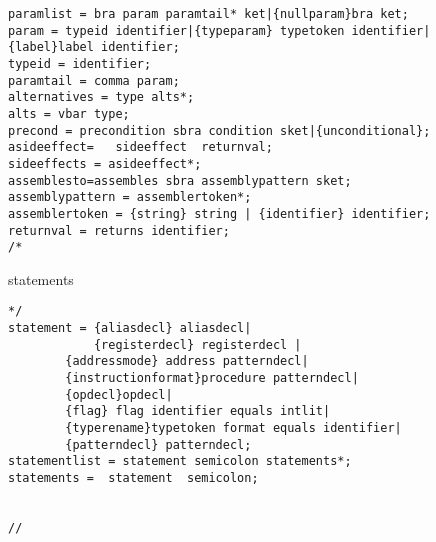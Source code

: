 \begin{verbatim}
paramlist = bra param paramtail* ket|{nullparam}bra ket;
param = typeid identifier|{typeparam} typetoken identifier|{label}label identifier;
typeid = identifier;
paramtail = comma param;
alternatives = type alts*; 
alts = vbar type;
precond = precondition sbra condition sket|{unconditional};
asideeffect=   sideeffect  returnval;
sideeffects = asideeffect*;
assemblesto=assembles sbra assemblypattern sket;
assemblypattern = assemblertoken*;
assemblertoken = {string} string | {identifier} identifier;
returnval = returns identifier;
/*\end{verbatim} statements \begin{verbatim}*/
statement = {aliasdecl} aliasdecl|
            {registerdecl} registerdecl |	    
		{addressmode} address patterndecl|
		{instructionformat}procedure patterndecl|
		{opdecl}opdecl|
		{flag} flag identifier equals intlit| 
		{typerename}typetoken format equals identifier|
		{patterndecl} patterndecl;
statementlist = statement semicolon statements*;
statements =  statement  semicolon;


// \end{verbatim}


